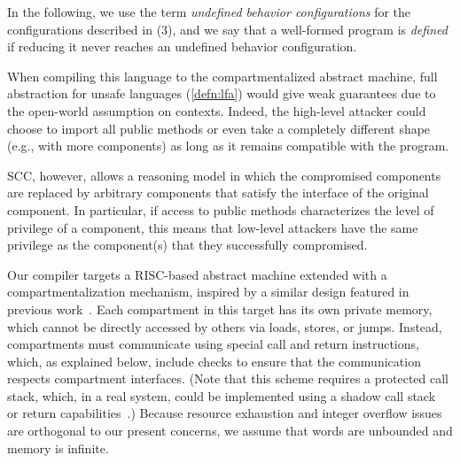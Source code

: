 \documentclass[10pt, conference, compsocconf, letterpaper, times]{IEEEtran}
\begin{document}
In the following, we use the term \emph{undefined behavior configurations}
for the
configurations described in (3), and we say that a well-formed program
is \emph{defined} if reducing it never reaches an undefined behavior
configuration.



\iffull
{}

When compiling this language to the compartmentalized abstract
machine, full abstraction for unsafe languages
(\autoref{defn:lfa}) would give weak guarantees due
to the open-world assumption on contexts.
Indeed, the high-level attacker could choose to import all public
methods or even take a completely different shape (e.g., with more
components) as long as it remains compatible with the program.

SCC, however, allows a reasoning model in
which the compromised components are replaced by arbitrary
components that satisfy the interface of the original component.
In particular, if access to public methods characterizes the level of
privilege of a component, this means that low-level attackers have
the same privilege as the component(s) that they successfully
compromised.
\fi

\label{sec:target}

Our compiler targets a RISC-based abstract machine extended with a
compartmentalization mechanism, inspired by a similar design featured
in previous work~\cite{micropolicies2015}. Each compartment in this
target has its own private memory, which cannot be directly accessed
by others via loads, stores, or jumps. Instead, compartments must
communicate using special call and return instructions, which, as
explained below, include checks to ensure that the communication
respects compartment interfaces. (Note that this scheme requires a
protected call stack, which, in a real system, could be implemented
\EG using a shadow call stack~\cite{ErlingssonAVBN06, AbadiBEL09} or
return capabilities~\cite{JuglaretHAPST15}.)
Because resource exhaustion and integer overflow issues are orthogonal
to our present concerns, we assume that words are unbounded and
memory is infinite.
\end{document}
